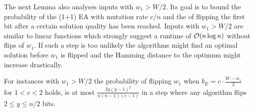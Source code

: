 The next Lemma also analyses inputs with $w_1>W/2$.
Its goal is to bound the probability of the (1+1) EA with mutation rate $c/n$ and the \RLSR[k\ge2] of flipping the first bit after a certain solution quality has been reached.
Inputs with $w_1>W/2$ are similar to linear functions which strongly suggest a runtime of $\mathcal{O}(n\log{n})$ without flips of $w_1$.
If such a step is too unlikely the algorithms might find an optimal solution before $w_1$ is flipped and the Hamming distance to the optimum might increase drastically.

\begin{lemma}\label{lemma:W1FlipWontHappen}
    For instances with $w_1>W/2$ the probability of flipping $w_1$ when $b_E = c\cdot\frac{W-w_1}{2}$ for $1<c<2$ holds, is at most \(\frac{2y{(y-1)}^2}{n(n-1)(c-1)}\) in a step where any algorithm flips $2\le y\le n/2$ bits.
\end{lemma}
